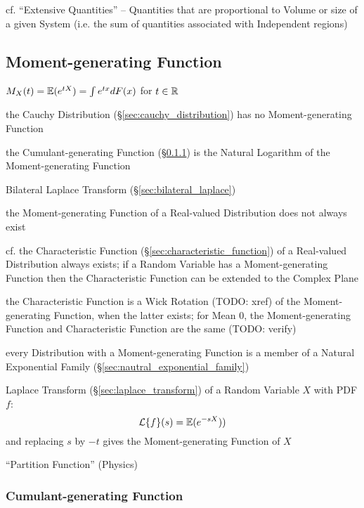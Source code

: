 cf. ``Extensive Quantities'' -- Quantities that are proportional to Volume or
size of a given System (i.e. the sum of quantities associated with Independent
regions)



\subsection{Moment-generating Function}\label{sec:moment_generating_function}

$M_X(t) = \mathbb{E}(e^{tX}) = \int e^{tx} dF(x)$ for $t \in \mathbb{R}$

the Cauchy Distribution (\S\ref{sec:cauchy_distribution}) has no
Moment-generating Function

the Cumulant-generating Function (\S\ref{sec:cumulant_generating_function}) is
the Natural Logarithm of the Moment-generating Function

\fist Bilateral Laplace Transform (\S\ref{sec:bilateral_laplace})

the Moment-generating Function of a Real-valued Distribution does not always
exist

cf. the Characteristic Function (\S\ref{sec:characteristic_function}) of a
Real-valued Distribution always exists; if a Random Variable has a
Moment-generating Function then the Characteristic Function can be extended to
the Complex Plane

the Characteristic Function is a Wick Rotation (TODO: xref) of the
Moment-generating Function, when the latter exists; for Mean $0$, the
Moment-generating Function and Characteristic Function are the same (TODO:
verify)

every Distribution with a Moment-generating Function is a member of a Natural
Exponential Family (\S\ref{sec:nautral_exponential_family})

Laplace Transform (\S\ref{sec:laplace_transform}) of a Random Variable $X$ with
PDF $f$:
\[
  \mathcal{L}\{f\}(s) = \mathbb{E}(e^{-sX}))
\]
and replacing $s$ by $-t$ gives the Moment-generating Function of $X$

``Partition Function'' (Physics)



\subsubsection{Cumulant-generating Function}
\label{sec:cumulant_generating_function}

